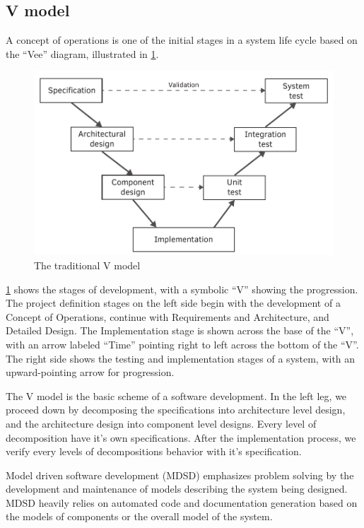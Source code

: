 \subsection{V model}

A concept of operations is one of the initial stages in a system life cycle based on the “Vee” diagram, illustrated in \cref{fig:intro:vmodel}.

\begin{figure}[h]
	\centering
	\includegraphics[width=0.8\linewidth]{include/figures/chapter_1/vmodel}
	\caption{The traditional V model \cite{vmodel}}
	\label{fig:intro:vmodel}
\end{figure}

\cref{fig:intro:vmodel} shows the stages of development, with a symbolic “V” showing the progression. The project definition stages on the left side begin with the development of a Concept of Operations, continue with Requirements and Architecture, and Detailed Design. The Implementation stage is shown across the base of the ``V'', with an arrow labeled ``Time'' pointing right to left across the bottom of the ``V''. The right side shows the testing and implementation stages of a system, with an upward-pointing arrow for progression. \cite{vmodel}

The V model is the basic scheme of a software development. In the left leg, we proceed down by decomposing the specifications into architecture level design, and the architecture design into component level designs. Every level of decomposition have it's own specifications. After the implementation process, we verify every levels of decompositions behavior with it's specification.


Model driven software development (MDSD) emphasizes problem solving by the development and maintenance of models describing the system being designed. MDSD heavily relies on automated code and documentation generation based on the models of components or the overall model of the system. 

